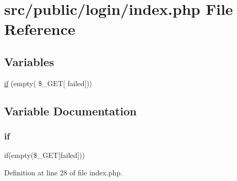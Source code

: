 \hypertarget{login_2index_8php}{}\section{src/public/login/index.php File Reference}
\label{login_2index_8php}
\subsection*{Variables}
\begin{DoxyCompactItemize}
\item 
\hyperlink{login_2index_8php_ab51de40bbba7bda6a6baf15c5564dc16}{if} (empty( \$\+\_\+\+G\+ET\mbox{[} \textquotesingle{}failed\textquotesingle{}\mbox{]}))
\end{DoxyCompactItemize}


\subsection{Variable Documentation}
\mbox{\label{login_2index_8php_ab51de40bbba7bda6a6baf15c5564dc16}} 
\subsubsection{\texorpdfstring{if}{if}}
{\footnotesize\ttfamily if(empty(\$\+\_\+\+G\+ET\mbox{[}\textquotesingle{}failed\textquotesingle{}\mbox{]}))}



Definition at line 28 of file index.\+php.

